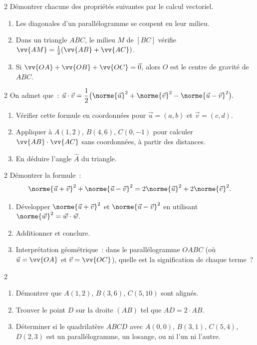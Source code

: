 \begin{exo}{2}
D\'emontrer chacune des propri\'et\'es suivantes par le calcul vectoriel.
\begin{enumerate}
  \item Les diagonales d'un parall\'elogramme se coupent en leur milieu.
  \item Dans un triangle $ABC$, le milieu $M$ de $[BC]$ v\'erifie
        $\vv{AM} = \frac{1}{2}(\vv{AB}+\vv{AC})$.
  \item Si $\vv{OA}+\vv{OB}+\vv{OC} = \vec{0}$, alors $O$ est le centre de gravité de $ABC$.
\end{enumerate}
\end{exo}

\begin{exo}{2}
On admet que~:
$\vec{u}\cdot\vec{v} = \dfrac{1}{2}\bigl(\norme{\vec{u}}^2+\norme{\vec{v}}^2
-\norme{\vec{u}-\vec{v}}^2\bigr).$
\begin{enumerate}
  \item V\'erifier cette formule en coordonn\'ees pour $\vec{u}=(a,b)$
        et $\vec{v}=(c,d)$.
  \item Appliquer \`a $A(1,2)$, $B(4,6)$, $C(0,-1)$ pour calculer
        $\vv{AB}\cdot\vv{AC}$ sans coordonn\'ees, \`a partir des distances.
  \item En d\'eduire l'angle $\hat{A}$ du triangle.
\end{enumerate}
\end{exo}

\begin{exo}{2}
D\'emontrer la formule~:
$$\norme{\vec{u}+\vec{v}}^2 + \norme{\vec{u}-\vec{v}}^2
  = 2\norme{\vec{u}}^2 + 2\norme{\vec{v}}^2.$$
\begin{enumerate}
  \item D\'evelopper $\norme{\vec{u}+\vec{v}}^2$ et $\norme{\vec{u}-\vec{v}}^2$
        en utilisant $\norme{\vec{w}}^2=\vec{w}\cdot\vec{w}$.
  \item Additionner et conclure.
  \item Interpr\'etation g\'eom\'etrique~: dans le parall\'elogramme $OABC$
        (o\`u $\vec{u}=\vv{OA}$ et $\vec{v}=\vv{OC}$), quelle est la signification
        de chaque terme~?
\end{enumerate}
\end{exo}

\begin{exo}{2}
\begin{enumerate}
  \item D\'emontrer que $A(1,2)$, $B(3,6)$, $C(5,10)$ sont align\'es.
  \item Trouver le point $D$ sur la droite $(AB)$ tel que $AD = 2\cdot AB$.
  \item D\'eterminer si le quadrilat\`ere $ABCD$ avec $A(0,0)$, $B(3,1)$,
        $C(5,4)$, $D(2,3)$ est un parall\'elogramme, un losange, ou ni l'un ni l'autre.
\end{enumerate}
\end{exo}

